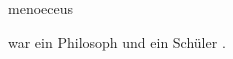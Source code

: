 \documentclass{stex}
\begin{document}
\begin{smodule}[sig=en]{menoeceus}
\begin{sparagraph}[style=symdoc]
 war ein 
Philosoph und ein Schüler .
\end{sparagraph}
\end{smodule}
\end{document}
